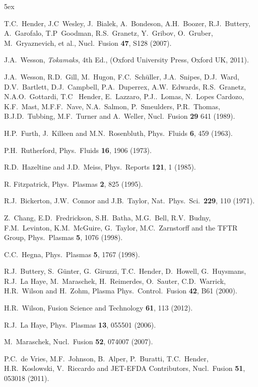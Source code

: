\documentclass[12pt,prb,aps]{revtex4-1}
\begin{document}
\begin{thebibliography}{99}\baselineskip 5ex

 T.C.~Hender, J.C~Wesley, J.~Bialek, A.~Bondeson, A.H.~Boozer, R.J.~Buttery, A.~Garofalo, T.P~Goodman, R.S.~Granetz, Y.~Gribov, O.~Gruber, 
M.~Gryaznevich, et al., Nucl.\  Fusion {\bf 47}, S128 (2007).

 J.A.~Wesson, {\em Tokamaks}, 4th Ed., (Oxford University Press, Oxford UK, 2011).

 J.A.~Wesson, R.D.~Gill, M.~Hugon, F.C.~Sch\"{u}ller, J.A.~Snipes, D.J.~Ward, D.V.~Bartlett, D.J.~Campbell, P.A.~Duperrex, A.W.~Edwards, 
R.S.~Granetz, N.A.O.~Gottardi, T.C~ Hender, E.~Lazzaro, P.J..~Lomas, N.~Lopes Cardozo, K.F.~Mast, M.F.F.~Nave, N.A.~Salmon, P.~Smeulders, 
P.R.~Thomas, B.J.D.~Tubbing, M.F.~Turner and A.~Weller, Nucl.\ Fusion {\bf 29} 641 (1989). 

 H.P.~Furth,  J.~Killeen and M.N.~Rosenbluth,  Phys.\ Fluids {\bf 6}, 459 (1963).

 P.H.~Rutherford, Phys.\ Fluids {\bf 16}, 1906 (1973).

 R.D.~Hazeltine and J.D.~Meiss, Phys.\ Reports {\bf 121}, 1 (1985).

 R. Fitzpatrick, Phys.\ Plasmas {\bf 2}, 825 (1995).

 R.J.~Bickerton, J.W.~Connor and J.B.~Taylor, Nat.\ Phys.\ Sci.\ {\bf 229}, 110 (1971). 

 Z.~Chang,  E.D.~Fredrickson, S.H.~Batha,  M.G.~Bell,  R.V.~Budny,  F.M.~Levinton, K.M.~McGuire, G.~Taylor,  M.C.~Zarnstorff and the  TFTR Group, Phys.\ Plasmas {\bf 5}, 1076  (1998).

 C.C.~Hegna, Phys.\ Plasmas {\bf 5}, 1767 (1998).

 R.J.~Buttery, S.~G\"{u}nter, G.~Giruzzi, T.C.~Hender, D.~Howell, G.~Huysmans, R.J.~La Haye, M.~Maraschek, H.~Reimerdes, O.~Sauter,
 C.D.~Warrick, H.R.~Wilson and H.~Zohm, Plasma Phys.\ Control.\ Fusion {\bf 42}, B61 (2000).
 
 H.R.~Wilson, Fusion Science and Technology {\bf 61},  113 (2012). 
 
 R.J.~La Haye, Phys.\ Plasmas {\bf 13}, 055501 (2006).

 M.~Maraschek, Nucl.\ Fusion {\bf 52}, 074007 (2007). 

 P.C.~de Vries, M.F.~Johnson, B.~Alper, P.~Buratti, T.C.~Hender, H.R.~Koslowski, V.~Riccardo and JET-EFDA Contributors,  Nucl.\ Fusion {\bf 51},  053018 (2011).


\end{thebibliography}
\end{document}
